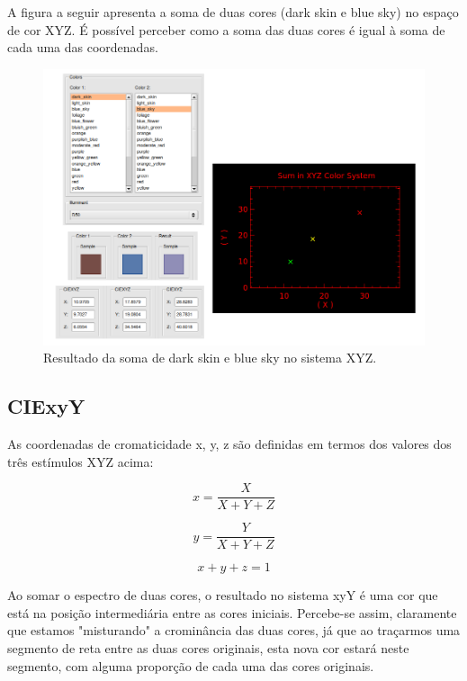 \documentclass[a4paper,10pt]{report}
\begin{document}
\par
A figura a seguir apresenta a soma de duas cores (dark skin e blue sky) no
espaço de cor XYZ. É possível perceber como a soma das duas cores é igual à
soma de cada uma das coordenadas.

\begin{figure}[!htb]
     \centering
\includegraphics[scale=0.6]{img/XYZ_linearity_sample.png}
     \caption{Resultado da soma de dark skin e blue sky no sistema XYZ.}
     \label{fig:XYZ_linearity_sample}
\end{figure}

\subsection{CIExyY}
As coordenadas de cromaticidade x, y, z são definidas em termos dos valores
dos três estímulos XYZ acima:

\begin{equation}\label{eq:xyz_x}
x=\frac{X}{X+Y+Z}
\end{equation}

\begin{equation}\label{eq:xyz_y}
y=\frac{Y}{X+Y+Z}
\end{equation}

\begin{equation}\label{eq:xyz_z}
x+y+z=1
\end{equation}

\par
Ao somar o espectro de duas cores, o resultado no sistema xyY é uma cor que está
na posição intermediária entre as cores iniciais. Percebe-se assim, claramente
que estamos "misturando" a crominância das duas cores, já que ao traçarmos uma
segmento de reta entre as duas cores originais, esta nova cor estará neste
segmento, com alguma proporção de cada uma das cores originais.
\end{document}
